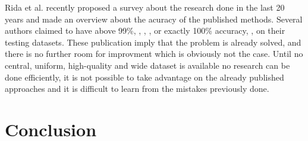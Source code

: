\documentclass[draft,final]{vutinfth} %
\begin{document}
Rida et al. \cite{rida2019forensic} recently proposed a survey about the research done in the last 20 years and made an overview about the acuracy of the published methods.
Several authors claimed to have above 99\%, \cite{algarni2008novel}, \cite{alizadeh2017automatic}, \cite{almaadeed2015partial}, or exactly 100\% accuracy, \cite{gueham2007automatic}, on their testing datasets.
These publication imply that the problem is already solved, and there is no further room for improvment which is obviously not the case.
Until no central, uniform, high-quality and wide dataset is available no research can be done efficiently, it is not possible to take advantage on the already published approaches and it is difficult to learn from the mistakes previously done.

\chapter{Conclusion}


\backmatter


\cleardoublepage %






\end{document}
